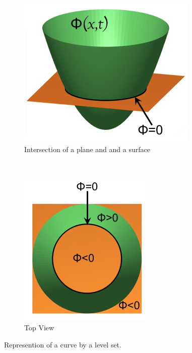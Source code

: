 \begin{figure}[h!]
    \centering
    \begin{subfigure}[t]{0.4\textwidth}
        \includegraphics[width=0.75\linewidth]{Figures/Ch_MDP/level1a.png}
        \caption{Intersection of a plane and and a surface}
        \label{fig:MDP_level1a}
    \end{subfigure}
    ~
    \begin{subfigure}[t]{0.4\textwidth}
        \includegraphics[width=0.75\linewidth]{Figures/Ch_MDP/level1b.png}
        \caption{Top View}
        \label{fig:MDP_level1b}
    \end{subfigure}
    \caption{Represention of a curve by a level set.}
    \label{fig:MDP_level_set}
\end{figure}

